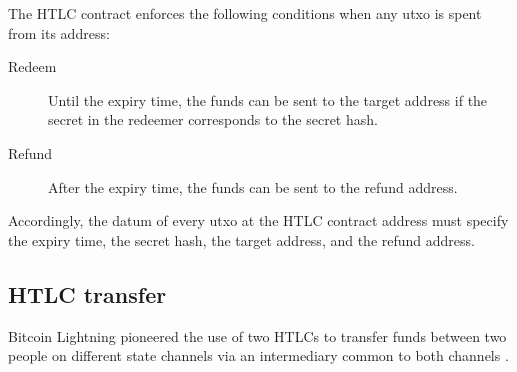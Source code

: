 \documentclass[11pt,a4paper,oneside]{article}
\begin{document}
\begin{multicols}{2}
The HTLC contract enforces the following conditions when any utxo is spent from its address:
\begin{description}
  \item[Redeem] Until the expiry time, the funds can be sent to the target address
    if the secret in the redeemer corresponds to the secret hash.
  \item[Refund] After the expiry time, the funds can be sent to the refund address.
\end{description}
Accordingly, the datum of every utxo at the HTLC contract address must specify the expiry time, the secret hash, the target address, and the refund address.

\subsection{HTLC transfer}%
\label{h:htlc-transfer}

Bitcoin Lightning \citep{PoonDryjaBitcoinLightningNetwork2016} pioneered the use of two HTLCs to transfer funds between two people on different state channels via an intermediary common to both channels \citep{LightningLabsHashedTimelockContract2023}.


\end{multicols}
\end{document}
